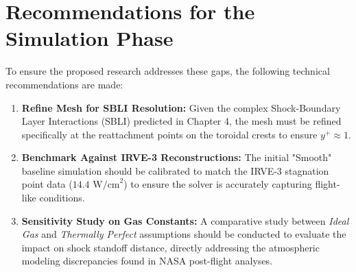 \section{Recommendations for the Simulation Phase}
To ensure the proposed research addresses these gaps, the following technical recommendations are made:

\begin{enumerate}
    \item \textbf{Refine Mesh for SBLI Resolution:} Given the complex Shock-Boundary Layer Interactions (SBLI) predicted in Chapter 4, the mesh must be refined specifically at the reattachment points on the toroidal crests to ensure $y^+ \approx 1$.
    
    \item \textbf{Benchmark Against IRVE-3 Reconstructions:} The initial "Smooth" baseline simulation  should be calibrated to match the IRVE-3 stagnation point data ($14.4 \text{ W/cm}^2$) to ensure the solver is accurately capturing flight-like conditions.
    
    \item \textbf{Sensitivity Study on Gas Constants:} A comparative study between \textit{Ideal Gas} and \textit{Thermally Perfect} assumptions should be conducted to evaluate the impact on shock standoff distance, directly addressing the atmospheric modeling discrepancies found in NASA post-flight analyses.
\end{enumerate}